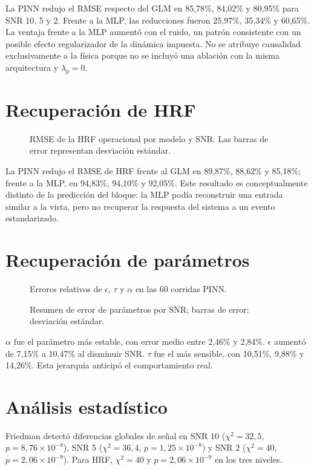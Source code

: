 La PINN redujo el RMSE respecto del GLM en 85,78\%, 84,02\% y 80,95\% para SNR 10, 5 y 2. Frente a la MLP, las reducciones fueron 25,97\%, 35,34\% y 60,65\%. La ventaja frente a la MLP aumentó con el ruido, un patrón consistente con un posible efecto regularizador de la dinámica impuesta. No se atribuye causalidad exclusivamente a la física porque no se incluyó una ablación con la misma arquitectura y $\lambda_p=0$.

\section{Recuperación de HRF}
\begin{figure}[H]
\centering
{}
\caption{RMSE de la HRF operacional por modelo y SNR. Las barras de error representan desviación estándar.}
\label{fig:synthetic_hrf_summary}
\end{figure}

La PINN redujo el RMSE de HRF frente al GLM en 89,87\%, 88,62\% y 85,18\%; frente a la MLP, en 94,83\%, 94,10\% y 92,05\%. Este resultado es conceptualmente distinto de la predicción del bloque: la MLP podía reconstruir una entrada similar a la vista, pero no recuperar la respuesta del sistema a un evento estandarizado.

\section{Recuperación de parámetros}
\begin{figure}[H]
\centering
{}
\caption{Errores relativos de $\epsilon$, $\tau$ y $\alpha$ en las 60 corridas PINN.}
\label{fig:param_recovery_detailed}
\end{figure}

\begin{figure}[H]
\centering
{}
\caption{Resumen de error de parámetros por SNR; barras de error: desviación estándar.}
\label{fig:param_recovery_summary}
\end{figure}

$\alpha$ fue el parámetro más estable, con error medio entre 2,46\% y 2,84\%. $\epsilon$ aumentó de 7,15\% a 10,47\% al disminuir SNR. $\tau$ fue el más sensible, con 10,51\%, 9,88\% y 14,26\%. Esta jerarquía anticipó el comportamiento real.

\section{Análisis estadístico}
Friedman detectó diferencias globales de señal en SNR 10 ($\chi^2=32{,}5$, $p=8{,}76\times10^{-8}$), SNR 5 ($\chi^2=36{,}4$, $p=1{,}25\times10^{-8}$) y SNR 2 ($\chi^2=40$, $p=2{,}06\times10^{-9}$). Para HRF, $\chi^2=40$ y $p=2{,}06\times10^{-9}$ en los tres niveles.

